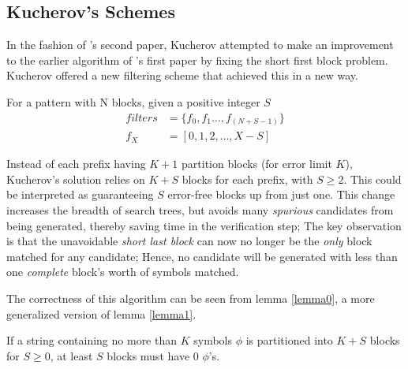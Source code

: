 {\subsection{Kucherov's Schemes}
\label{schemes:kuch}

In the fashion of \vali{}'s second paper, Kucherov attempted to make an improvement to the earlier algorithm of \vali{}'s first paper by fixing the short first \gls{block} problem. Kucherov offered a new \gls{filtering scheme} that achieved this in a new way.

\begin{fscheme}
\textup{For a pattern with N blocks, given a positive integer $S$}
\label{kuchfilters}
\begin{align*}
filters &= \{f_0, f_1\ldots{}, f_{(N+S-1)}\}\\
f_X &= [0, 1, 2,\ldots , X-S]
\end{align*}
\end{fscheme}

Instead of each prefix having $K+1$ partition blocks (for error limit $K$), Kucherov's solution relies on $K+S$ blocks for each prefix, with $S\geq2$. This could be interpreted as guaranteeing $S$ error-free blocks up from just one. This change increases the breadth of search trees, but avoids many \textit{spurious} candidates from being generated, thereby saving time in the \gls{verification step}; The key observation is that the unavoidable \textit{short last block} can now no longer be the \textit{only} block matched for any candidate; Hence, no candidate will be generated with less than one \textit{complete} block's worth of symbols matched.

The correctness of this algorithm can be seen from lemma \ref{lemma0}, a more generalized version of lemma \ref{lemma1}.

\begin{lemma}
\label{lemma0}
If a string containing no more than $K$ symbols $\phi{}$ is partitioned into $K+S$ blocks for $S \geq 0$, at least $S$ blocks must have $0$ $\phi{}$'s.
\end{lemma}

}
